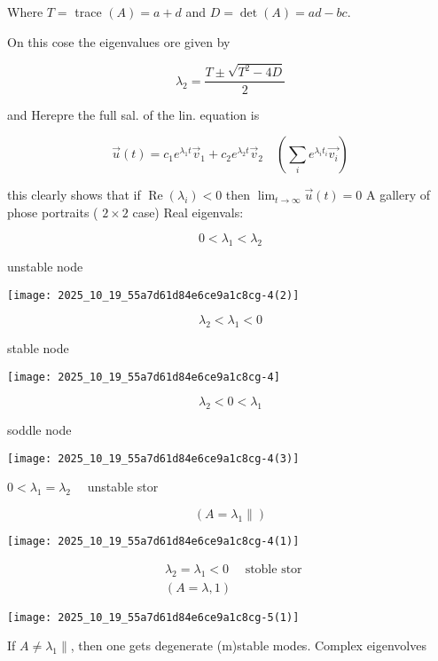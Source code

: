 Where $T=$ trace $(A)=a+d$ and $D=\operatorname{det}(A)=a d-b c$.

On this cose the eigenvalues ore given by

$$
\lambda_{2}=\frac{T \pm \sqrt{T^{2}-4 D}}{2}
$$

and Herepre the full sal. of the lin. equation is

$$
\vec{u}(t)=c_{1} e^{\lambda_{1} t} \vec{v}_{1}+c_{2} e^{\lambda_{2} t} \vec{v}_{2} \quad\left(\sum_{i} e^{\lambda_{i} t_{i}} \overrightarrow{v_{i}}\right)
$$

this clearly shows that if $\operatorname{Re}\left(\lambda_{i}\right)<0$ then $\lim _{t \rightarrow \infty} \vec{u}(t)=0$
A gallery of phose portraits ( $2 \times 2$ case)
Real eigenvals:

$$
0<\lambda_{1}<\lambda_{2}
$$

unstable node
\begin{center}
\texttt{[image: 2025\_10\_19\_55a7d61d84e6ce9a1c8cg-4(2)]}
\end{center}

$$
\lambda_{2}<\lambda_{1}<0
$$

stable node
\begin{center}
\texttt{[image: 2025\_10\_19\_55a7d61d84e6ce9a1c8cg-4]}
\end{center}

$$
\lambda_{2}<0<\lambda_{1}
$$

soddle node
\begin{center}
\texttt{[image: 2025\_10\_19\_55a7d61d84e6ce9a1c8cg-4(3)]}
\end{center}
$0<\lambda_{1}=\lambda_{2} \quad$ unstable stor

$$
\left(A=\lambda_{1} \|\right)
$$

\begin{center}
\texttt{[image: 2025\_10\_19\_55a7d61d84e6ce9a1c8cg-4(1)]}
\end{center}

$$
\begin{aligned}
& \lambda_{2}=\lambda_{1}<0 \quad \text { stoble stor } \\& (A=\lambda, 1)
\end{aligned}
$$

\begin{center}
\texttt{[image: 2025\_10\_19\_55a7d61d84e6ce9a1c8cg-5(1)]}
\end{center}

If $A \neq \lambda_{1} \|$, then one gets degenerate (m)stable modes.
Complex eigenvolves

